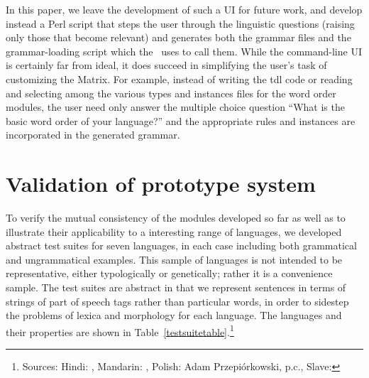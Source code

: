 In this paper, we leave the development of such a UI for future work,
and develop instead a Perl script that steps the user through the
linguistic questions (raising only those that become relevant) and
generates both the grammar files and the grammar-loading script which
the \lkb\ uses to call them.  While the command-line UI is certainly far
from ideal, it does succeed in simplifying the user's task of
customizing the Matrix.
For example, instead of writing the tdl code or reading and
selecting among the various types and instances files for the word
order modules, the user need only answer the multiple choice question
``What is the basic word order of your language?'' and the appropriate
rules and instances are incorporated in the generated grammar.


\section{Validation of prototype system}

To verify the mutual consistency of the modules developed so far as
well as to illustrate their applicability to a interesting range of
languages, we developed abstract test suites for seven languages, in
each case including both grammatical and ungrammatical examples.  This
sample of languages is not intended to be representative, either
typologically or genetically; rather it is a convenience sample.  The
test suites are abstract in that we represent sentences in terms of
strings of part of speech tags rather than particular words, in order
to sidestep the problems of lexica and morphology for each language.
The languages and their properties are shown in
Table~\ref{testsuitetable}.\footnote{Sources: Hindi: ,
Mandarin: , Polish: Adam Przepi\'{o}rkowski, p.c.,
Slave: }

